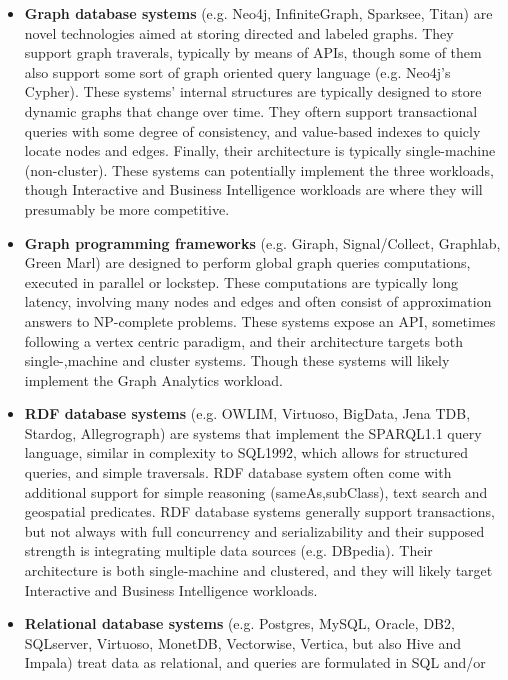 \begin{itemize}
 \item \textbf{Graph database systems} (e.g. Neo4j, InfiniteGraph, Sparksee,
     Titan) are novel technologies aimed at storing directed and labeled
     graphs. They support graph traverals, typically by means of APIs, though
     some of them also support some sort of graph oriented query language (e.g.
     Neo4j's Cypher). These systems' internal structures are typically designed
     to store dynamic graphs that change over time.  They oftern support
     transactional queries with some degree of consistency, and value-based
     indexes to quicly locate nodes and edges. Finally, their architecture is
     typically single-machine (non-cluster). These systems can 
     potentially implement the three workloads, though Interactive and Business Intelligence
     workloads are where they will presumably be more competitive.
 \item \textbf{Graph programming frameworks} (e.g. Giraph, Signal/Collect,
     Graphlab, Green Marl) are designed to perform global graph queries
     computations, executed in parallel or lockstep. These computations are typically
     long latency, involving many nodes and edges and often consist of approximation
     answers to NP-complete problems. These systems expose an API, sometimes following
     a vertex centric paradigm, and their architecture targets both single-,machine and
     cluster systems. Though these systems will likely implement the Graph Analytics workload.
 \item \textbf{RDF database systems} (e.g. OWLIM, Virtuoso, BigData, Jena TDB,
     Stardog, Allegrograph) are systems that implement the SPARQL1.1 query
     language, similar in complexity to SQL1992, which allows for structured
     queries, and simple traversals. RDF database system often come with
     additional support for simple reasoning (sameAs,subClass), text search and
     geospatial predicates.  RDF database systems generally support
     transactions, but not always with full concurrency and serializability and
     their supposed strength is integrating multiple data sources (e.g.
     DBpedia). Their architecture is both single-machine and clustered, and
     they will likely target Interactive and Business Intelligence workloads.
 \item \textbf{Relational database systems} (e.g. Postgres, MySQL, Oracle, DB2,
     SQLserver, Virtuoso, MonetDB, Vectorwise, Vertica, but also Hive and
     Impala) treat data as relational, and queries are formulated in SQL and/or

\end{itemize}
